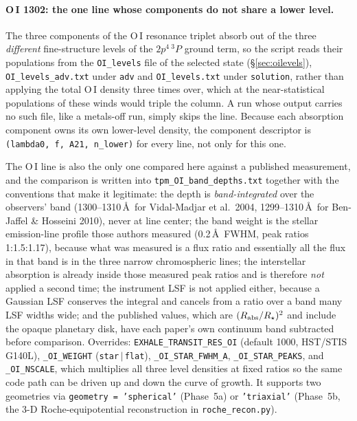 \documentclass[english,a4paper]{my_memo}
\begin{document}
\paragraph{O\,I 1302: the one line whose components do not share a lower level.}
The three components of the O\,I resonance triplet absorb out of the three
\emph{different} fine-structure levels of the $2p^4\,^3P$ ground term, so the
script reads their populations from the \texttt{OI\_levels} file of the
selected state (\S\ref{sec:oilevels}), \texttt{OI\_levels\_adv.txt} under
\texttt{adv} and \texttt{OI\_levels.txt} under \texttt{solution}, rather
than applying the total O\,I density three times over, which at the
near-statistical populations of these winds would triple the column. A run
whose output carries no such file, like a metals-off run, simply skips the
line. Because each absorption component owns its own lower-level
density, the component descriptor is
\texttt{(lambda0, f, A21, n\_lower)} for every line, not only for this one.

The O\,I line is also the only one compared here against a published
measurement, and the comparison is written into
\texttt{tpm\_OI\_band\_depths.txt} together with the conventions that make it
legitimate: the depth is \emph{band-integrated} over the observers' band
(1300--1310\,\AA\ for Vidal-Madjar et al.\ 2004, 1299--1310\,\AA\ for
Ben-Jaffel \& Hosseini 2010), never at line center; the band weight is the
stellar emission-line profile those authors measured (0.2\,\AA\ FWHM, peak
ratios 1:1.5:1.17), because what was measured is a flux ratio and essentially
all the flux in that band is in the three narrow chromospheric lines; the
interstellar absorption is already inside those measured peak ratios and is
therefore \emph{not} applied a second time; the instrument LSF is not applied
either, because a Gaussian LSF conserves the integral and cancels from a ratio
over a band many LSF widths wide; and the published values, which are
$(R_{\rm abs}/R_\star)^2$ and include the opaque planetary disk, have each
paper's own continuum band subtracted before comparison. Overrides:
\texttt{EXHALE\_TRANSIT\_RES\_OI} (default 1000, HST/STIS G140L),
\texttt{\_OI\_WEIGHT} (\texttt{star}\,$|$\,\texttt{flat}),
\texttt{\_OI\_STAR\_FWHM\_A}, \texttt{\_OI\_STAR\_PEAKS}, and
\texttt{\_OI\_NSCALE}, which multiplies all three level densities at fixed
ratios so the same code path can be driven up and down the curve of growth. It supports two
geometries via \texttt{geometry = 'spherical'} (Phase~5a) or \texttt{'triaxial'}
(Phase~5b, the 3-D Roche-equipotential reconstruction in \texttt{roche\_recon.py}).
\end{document}
